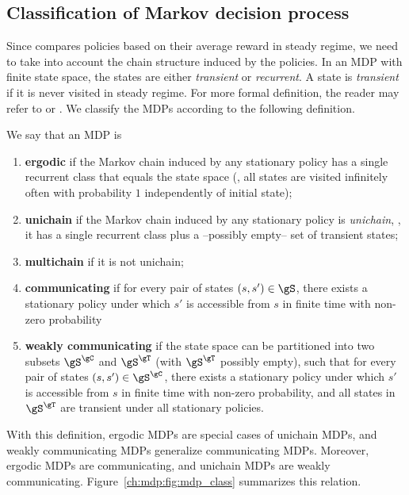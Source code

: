 \subsection{Classification of Markov decision process}
Since  compares policies based on their average reward in steady regime, we need to take into account the chain structure induced by the policies.
In an MDP with finite state space, the states are either \emph{transient} or \emph{recurrent}.
A state is \emph{transient} if it is never visited in steady regime.
For more formal definition, the reader may refer to \cite[Appendix~A]{puterman2014markov} or \cite{levin2017markov}.
We classify the MDPs according to the following definition.
\begin{defn}
    \label{ch:mdp:defn:mdp_class}
    We say that an MDP is
    \begin{enumerate}[label=(\roman*)]
        \item \textbf{ergodic} if the Markov chain induced by any stationary policy has a single recurrent class that equals the state space (\ie, all states are visited infinitely often with probability $1$ independently of initial state);
        \item \label{it:unichain} \textbf{unichain} if the Markov chain induced by any stationary policy is \emph{unichain}, \ie, it has a single recurrent class plus a --possibly empty-- set of transient states;
        \item \textbf{multichain} if it is not unichain;
        \item \textbf{communicating} if for every pair of states $(s,s')\in\gS$, there exists a stationary policy under which $s'$ is accessible from $s$ in finite time with non-zero probability
        \item \textbf{weakly communicating} if the state space can be partitioned into two subsets $\gS^{\gC}$ and $\gS^{\gT}$ (with $\gS^{\gT}$ possibly empty), such that for every pair of states $(s,s')\in\gS^{\gC}$, there exists a stationary policy under which $s'$ is accessible from $s$ in finite time with non-zero probability, and all states in $\gS^{\gT}$ are transient under all stationary policies.
    \end{enumerate}
\end{defn}
With this definition, ergodic MDPs are special cases of unichain MDPs, and weakly communicating MDPs generalize communicating MDPs. 
Moreover, ergodic MDPs are communicating, and unichain MDPs are weakly communicating.
Figure~\ref{ch:mdp:fig:mdp_class} summarizes this relation.

